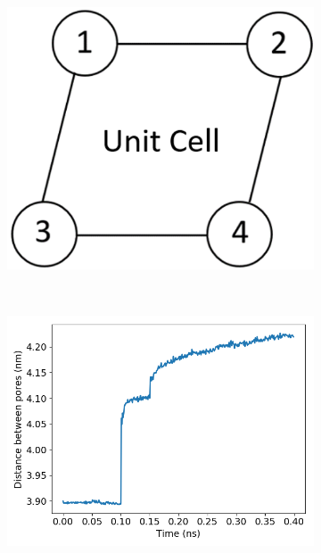 \documentclass{article}
\begin{document}
  	\begin{figure}[!htb]
	\centering
	\begin{subfigure}{0.3\textwidth}
	\includegraphics[width=\textwidth]{p2p_diagram.png}
	\caption{}~\label{fig:p2p_diagram}
  	\end{subfigure} 
	\begin{subfigure}{0.3\textwidth}
		\includegraphics[width=\textwidth]{p2p_39.png}\quad

\end{subfigure}
\end{figure}
\end{document}
